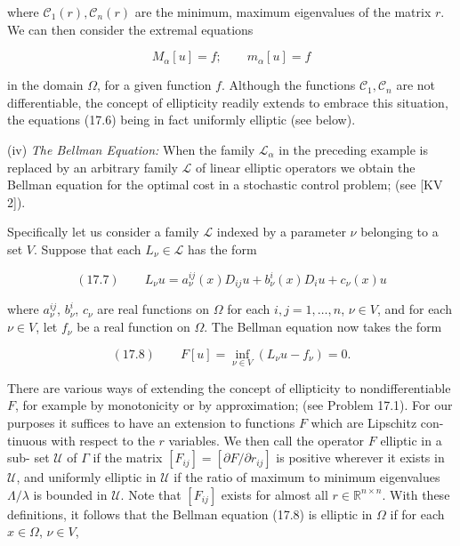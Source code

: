 where $\mathcal{C}_1(r), \mathcal{C}_n(r)$ are the minimum, maximum eigenvalues of the matrix $r$. We can
then consider the extremal equations

\begin{equation}
M_\alpha[u] = f;\qquad m_\alpha[u] = f
\tag{17.6}
\end{equation}

in the domain $\Omega$, for a given function $f$. Although the functions $\mathcal{C}_1, \mathcal{C}_n$ are not
differentiable, the concept of ellipticity readily extends to embrace this situation,
the equations (17.6) being in fact uniformly elliptic (see below).

(iv) \emph{The Bellman Equation:} When the family $\mathcal{L}_\alpha$ in the preceding example is
replaced by an arbitrary family $\mathcal{L}$ of linear elliptic operators we obtain the Bellman
equation for the optimal cost in a stochastic control problem; (see [KV 2]).


Specifically let us consider a family $\mathcal L$ indexed by a parameter $\nu$ belonging to a set
$V$. Suppose that each $L_\nu \in \mathcal L$ has the form

\[
(17.7)\qquad L_\nu u = a_\nu^{ij}(x)D_{ij}u + b_\nu^i(x)D_i u + c_\nu(x)u
\]

where $a_\nu^{ij}$, $b_\nu^i$, $c_\nu$ are real functions on $\Omega$ for each $i, j = 1, \ldots, n$, $\nu \in V$, and for each
$\nu \in V$, let $f_\nu$ be a real function on $\Omega$. The Bellman equation now takes the form

\[
(17.8)\qquad F[u] = \inf_{\nu \in V}(L_\nu u - f_\nu) = 0.
\]

There are various ways of extending the concept of ellipticity to nondifferentiable
$F$, for example by monotonicity or by approximation; (see Problem 17.1). For our
purposes it suffices to have an extension to functions $F$ which are Lipschitz con-
tinuous with respect to the $r$ variables. We then call the operator $F$ elliptic in a sub-
set $\mathcal U$ of $\Gamma$ if the matrix $[F_{ij}] = [\partial F/\partial r_{ij}]$ is positive wherever it exists in $\mathcal U$, and
uniformly elliptic in $\mathcal U$ if the ratio of maximum to minimum eigenvalues $\Lambda/\lambda$ is
bounded in $\mathcal U$. Note that $[F_{ij}]$ exists for almost all $r \in \mathbb R^{n \times n}$. With these definitions,
it follows that the Bellman equation (17.8) is elliptic in $\Omega$ if for each $x \in \Omega$, $\nu \in V$,

